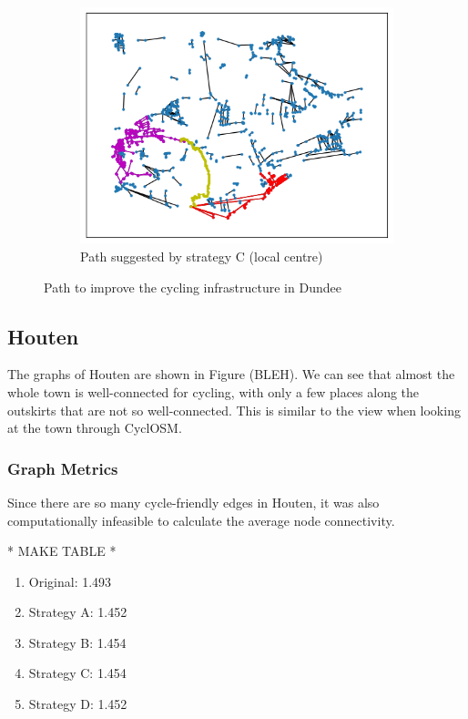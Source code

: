 \documentclass[12pt,a4paper]{report}
\begin{document}
\begin{figure}[ht]
\begin{subfigure}[ht]{0.6\textwidth}
    \end{subfigure}
    \hfill
    \begin{subfigure}[ht]{0.6\textwidth}
        \centering
        \includegraphics[width=\textwidth,trim={1cm 1cm 1cm 1cm},clip]{diss_images/eval/local_dundee.png}
        \caption{Path suggested by strategy C (local centre)}
        \label{fig:local dundee}
    \end{subfigure}
       \caption{Path to improve the cycling infrastructure in Dundee}
       \label{fig:path dundee}
\end{figure}

\subsection{Houten}
The graphs of Houten are shown in Figure (BLEH). We can see that almost the whole town is well-connected for cycling, with only a few places along the outskirts that are not so well-connected. This is similar to the view when looking at the town through CyclOSM.

\subsubsection*{Graph Metrics}
Since there are so many cycle-friendly edges in Houten, it was also computationally infeasible to calculate the average node connectivity.

* MAKE TABLE *

\begin{enumerate}
    \item Original: 1.493
    \item Strategy A: 1.452
    \item Strategy B: 1.454
    \item Strategy C: 1.454
    \item Strategy D: 1.452
\end{enumerate}
\end{document}
